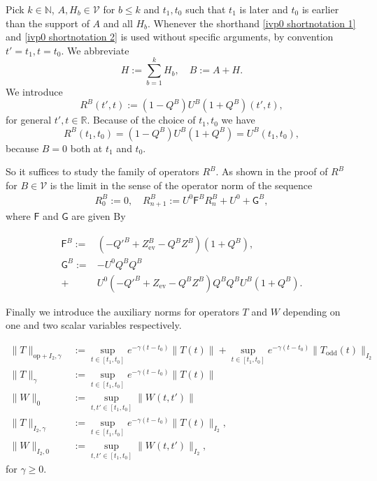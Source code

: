 \documentclass[b5paper,draft,openbib,12pt]{memoir}
\DeclareMathOperator{\ev}{ev}
\DeclareMathOperator{\odd}{odd}
\begin{document}
Pick \(k\in\mathbb{N}\), \(A,H_b\in\mathcal{V}\) for \(b\le k\) 
and \(t_1,t_0\) such that \(t_1\) is later and \(t_0\) is earlier 
than the support of \(A\) and all \(H_b\). Whenever the shorthand 
\eqref{ivp0 shortnotation 1} and \eqref{ivp0 shortnotation 2}
is used without specific arguments, by convention 
\(t'=t_1,t=t_0\).  We abbreviate
\begin{equation}
H:=\sum_{b=1}^k H_b, \quad B:=A+H.
\end{equation}
We introduce 
\begin{equation}
  R^B(t',t):=(1-Q^B)U^B(1+Q^B)(t',t),
\end{equation}
for general \(t',t\in\mathbb{R}\).
Because of the choice of \(t_1,t_0\) we have
\begin{equation}\label{def R}
R^B(t_1,t_0)=(1-Q^B)U^B(1+Q^B)=U^B(t_1,t_0),
\end{equation}
because \(B=0\) both at \(t_1\) and \(t_0\).

So it suffices to study the family of operators \(R^B\). 
As shown in the proof of \cite[lemma 3.5]{ivp0}
\(R^B\) for \(B\in\mathcal{V}\) is the limit in the sense of the 
operator norm of the sequence
\begin{align}
R^B_{0}:=0, \quad R^B_{n+1}:=U^0 \mathsf{F}^B R^B_{n}+ U^0 + \mathsf{G}^B,
\end{align}
where \(\mathsf{F}\) and \(\mathsf{G}\) are given By

\begin{align}
  \mathsf{F}^B:=& (-{Q'}^B+Z^B_{\ev}-Q^BZ^B)(1+Q^B),\\
  \mathsf{G}^B:=&- U^0Q^BQ^B \\
+& U^0(-{Q'}^B+Z_{\ev}-Q^B Z^B)Q^B Q^B U^B (1+Q^B).
\end{align}

Finally we introduce the auxiliary norms for operators \(T\) 
and \(W\) depending on one and two 
scalar variables respectively.

\begin{align}
  \|T \|_{\mathrm{op}+I_2,\gamma}
  &:=\sup_{t\in[t_1,t_0]}e^{-\gamma (t-t_0)} \|T(t)\|
  +\sup_{t\in[t_1,t_0]}e^{-\gamma (t-t_0)} \| T_{\odd}(t)\|_{I_2}\\
  \|T \|_{\gamma}&:=\sup_{t\in[t_1,t_0]}e^{-\gamma (t-t_0)} \|T(t)\|\\
  \|W \|_{0}&:=\sup_{t,t'\in[t_1,t_0]} \|W(t,t')\|\\
  \|T \|_{I_2 ,\gamma}&:=\sup_{t\in[t_1,t_0]}e^{-\gamma (t-t_0)} \| T(t)\|_{I_2},\\
  \|W \|_{I_2 ,0}&:=\sup_{t,t'\in[t_1,t_0]} \| W(t,t')\|_{I_2},
\end{align}
for \(\gamma\ge 0 \).
\end{document}
